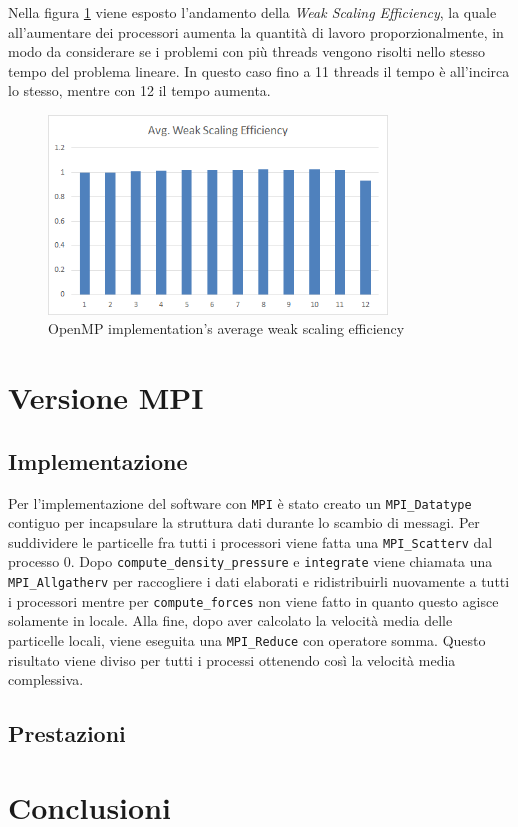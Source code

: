 \documentclass[a4paper, 12pt]{report}
\begin{document}
\begin{sloppypar}
  \bigskip
  \noindent
  Nella figura \ref{fig:omp_wse} viene esposto l'andamento della \textit{Weak Scaling Efficiency}, la quale
  all'aumentare dei processori aumenta la quantità di lavoro proporzionalmente, in modo da considerare se i
  problemi con più threads vengono risolti nello stesso tempo del problema lineare. In questo caso fino a 11
  threads il tempo è all'incirca lo stesso, mentre con 12 il tempo aumenta.

  \begin{figure}[ht]
    \centering
    \includegraphics[width=9cm]{img/omp-wse.png}
    \caption{OpenMP implementation's average weak scaling efficiency}
    \label{fig:omp_wse}
  \end{figure}
\end{sloppypar}

{\let\clearpage\relax\chapter*{Versione MPI}}
\section*{Implementazione}
Per l'implementazione del software con \texttt{MPI} è stato creato un \texttt{MPI\_Datatype} contiguo per incapsulare la struttura
dati durante lo scambio di messagi. Per suddividere le particelle fra tutti i processori viene fatta una \texttt{MPI\_Scatterv} dal processo 0.
Dopo \texttt{compute\_density\_pressure} e \texttt{integrate} viene chiamata una \texttt{MPI\_Allgatherv} per raccogliere i dati elaborati
e ridistribuirli nuovamente a tutti i processori mentre per \texttt{compute\_forces} non viene fatto in quanto questo agisce solamente in locale.
Alla fine, dopo aver calcolato la velocità media delle particelle locali, viene eseguita una \texttt{MPI\_Reduce} con operatore somma.
Questo risultato viene diviso per tutti i processi ottenendo così la velocità media complessiva.

\section*{Prestazioni}


\chapter*{Conclusioni}
\end{document}
